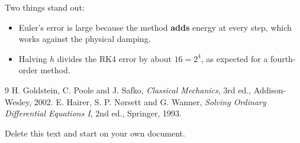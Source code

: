 \documentclass[11pt,a4paper]{article}
\begin{document}
Two things stand out:

\begin{itemize}
  \item Euler's error is large because the method \textbf{adds} energy at every step, which works against the physical damping.
  \item Halving $h$ divides the RK4 error by about $16=2^{4}$, as expected for a fourth-order method.
\end{itemize}

\begin{thebibliography}{9}
 H. Goldstein, C. Poole and J. Safko, \emph{Classical Mechanics}, 3rd ed., Addison-Wesley, 2002.
 E. Hairer, S. P. Nørsett and G. Wanner, \emph{Solving Ordinary Differential Equations I}, 2nd ed., Springer, 1993.
\end{thebibliography}

Delete this text and start on your own document.
\end{document}
